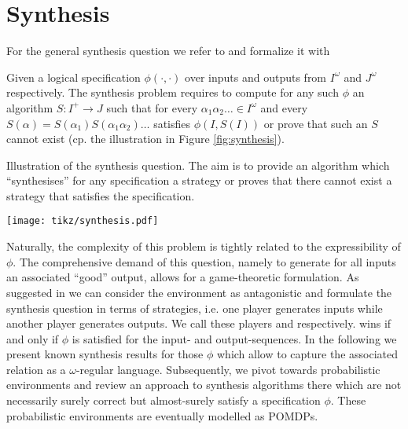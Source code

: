 \chapter{Synthesis}
\label{chapter:synthesis}
For the general synthesis question we refer to \cite{Church} and formalize it
with 
\begin{definition}
  Given a logical specification  $\phi(\cdot, \cdot)$ over inputs and 
  outputs from $I^{\omega}$ and $J^{\omega}$ respectively. The synthesis 
  problem requires to compute for any such $\phi$ an algorithm 
  $S:I^{+}\rightarrow J$ such that for every 
  $\alpha_{1}\alpha_{2}\dots\in I^{\omega}$ and every 
  $S(\alpha) = S(\alpha_{1})S(\alpha_{1}\alpha_{2})\dots$ satisfies 
  $\phi(I, S(I))$ or prove that such an $S$ cannot exist (cp. the 
  illustration in Figure \ref{fig:synthesis}).
\end{definition}
\begin{drawing}
  \caption{Illustration of the synthesis question. The aim is to provide an 
  algorithm which \enquote{synthesises} for any specification a strategy or 
  proves that there cannot exist a strategy that satisfies the specification.}
  \label{fig:synthesis}
  \begin{center}
    \texttt{[image: tikz/synthesis.pdf]}
  \end{center}
\end{drawing}
Naturally, the complexity of this problem is tightly related to the 
expressibility of $\phi$. The comprehensive demand of this question, namely
to generate for all inputs an associated \enquote{good} output, allows for a
game-theoretic formulation. As suggested in \cite{SeqCondStrat} we can consider
the environment as antagonistic and formulate the synthesis question in terms
of strategies, i.e. one player generates inputs while another player generates
outputs. We call these players  and \outputp{} respectively. \outputp 
wins if and only if $\phi$ is satisfied for the input- and output-sequences. In 
the following we present known synthesis results for those $\phi$ which allow 
to capture the associated relation as a $\omega$-regular language. 
Subsequently, we pivot towards probabilistic environments and review an 
approach to synthesis algorithms there which are not necessarily surely 
correct but almost-surely satisfy a specification $\phi$. These probabilistic
environments are eventually modelled as \acp{POMDP}. 

